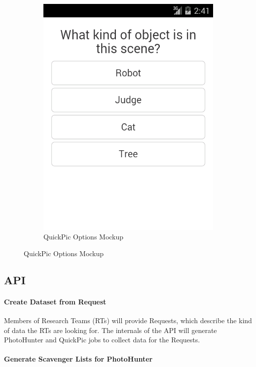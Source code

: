\documentclass{article}
\begin{document}
\begin{figure}
\begin{subfigure}[b]{0.49\textwidth}
    \includegraphics[width=\textwidth]{ss_quickpic_options}
    \caption{QuickPic Options Mockup}
  \end{subfigure}
\end{figure}

\subsection{API}

\paragraph{Create Dataset from Request}

Members of Research Teams (RTs) will provide Requests, which describe
the kind of data the RTs are looking for.  The internals of the API will
generate PhotoHunter and QuickPic jobs to collect data for the
Requests.

\paragraph{Generate Scavenger Lists for PhotoHunter}
\end{document}
